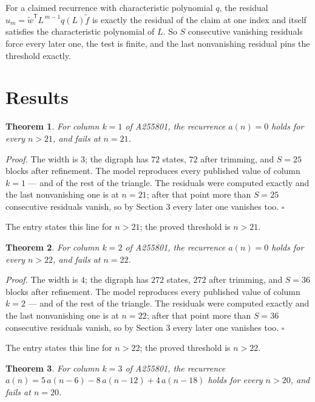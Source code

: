 \documentclass[11pt]{article}
\newtheorem{theorem}{Theorem}
\theoremstyle{definition}
\begin{document}
For a claimed recurrence with characteristic polynomial $q$, the residual $u_m = \tilde w^{\mathsf T}L^{\,m-1}q(L)\tilde f$ is exactly the residual of the claim at one index and itself satisfies the characteristic polynomial of $L$. So $S$ consecutive vanishing residuals force every later one, the test is finite, and the last nonvanishing residual pins the threshold exactly.

\section{Results}

\begin{theorem} For column $k = 1$ of A255801, the recurrence $a(n) = 0$ holds for every $n > 21$, and fails at $n = 21$.\end{theorem}

{\itshape Proof.} The width is $3$; the digraph has $72$ states, $72$ after trimming, and $S = 25$ blocks after refinement. The model reproduces every published value of column $k = 1$ --- and of the rest of the triangle. The residuals were computed exactly and the last nonvanishing one is at $n = 21$; after that point more than $S = 25$ consecutive residuals vanish, so by Section 3 every later one vanishes too. $\square$

The entry states this line for $n > 21$; the proved threshold is $n > 21$.

\begin{theorem} For column $k = 2$ of A255801, the recurrence $a(n) = 0$ holds for every $n > 22$, and fails at $n = 22$.\end{theorem}

{\itshape Proof.} The width is $4$; the digraph has $272$ states, $272$ after trimming, and $S = 36$ blocks after refinement. The model reproduces every published value of column $k = 2$ --- and of the rest of the triangle. The residuals were computed exactly and the last nonvanishing one is at $n = 22$; after that point more than $S = 36$ consecutive residuals vanish, so by Section 3 every later one vanishes too. $\square$

The entry states this line for $n > 22$; the proved threshold is $n > 22$.

\begin{theorem} For column $k = 3$ of A255801, the recurrence $a(n) = 5\,a(n-6) - 8\,a(n-12) + 4\,a(n-18)$ holds for every $n > 20$, and fails at $n = 20$.\end{theorem}
\end{document}
